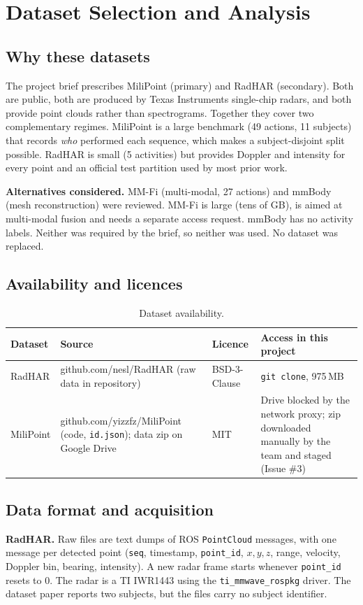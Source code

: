 \chapter{Dataset Selection and Analysis}
\label{ch:data}

\section{Why these datasets}
The project brief prescribes MiliPoint (primary) and RadHAR (secondary). Both are
public, both are produced by Texas Instruments single-chip radars, and both
provide point clouds rather than spectrograms. Together they cover two
complementary regimes. MiliPoint is a large benchmark (49 actions, 11 subjects)
that records \emph{who} performed each sequence, which makes a subject-disjoint
split possible. RadHAR is small (5 activities) but provides Doppler and intensity
for every point and an official test partition used by most prior work.

\textbf{Alternatives considered.} MM-Fi \cite{yang2023mmfi} (multi-modal, 27
actions) and mmBody \cite{chen2022mmbody} (mesh reconstruction) were reviewed.
MM-Fi is large (tens of GB), is aimed at multi-modal fusion and needs a separate
access request. mmBody has no activity labels. Neither was required by the brief,
so neither was used. No dataset was replaced.

\section{Availability and licences}
\begin{table}[h]
\centering
\caption{Dataset availability.}
\label{tab:avail}
\small
\begin{tabular}{L{2.2cm}L{5.5cm}L{2.6cm}L{4.0cm}}
\toprule
Dataset & Source & Licence & Access in this project \\
\midrule
RadHAR & github.com/nesl/RadHAR (raw data in repository) & BSD-3-Clause & \texttt{git clone}, 975\,MB \\
MiliPoint & github.com/yizzfz/MiliPoint (code, \texttt{id.json}); data zip on Google Drive & MIT & Drive blocked by the network proxy; zip downloaded manually by the team and staged (Issue \#3) \\
\bottomrule
\end{tabular}
\end{table}

\section{Data format and acquisition}
\textbf{RadHAR.} Raw files are text dumps of ROS \texttt{PointCloud} messages,
with one message per detected point (\texttt{seq}, timestamp, \texttt{point\_id},
$x,y,z$, range, velocity, Doppler bin, bearing, intensity). A new radar frame
starts whenever \texttt{point\_id} resets to 0. The radar is a TI IWR1443 using
the \texttt{ti\_mmwave\_rospkg} driver. The dataset paper reports two subjects,
but the files carry no subject identifier.

